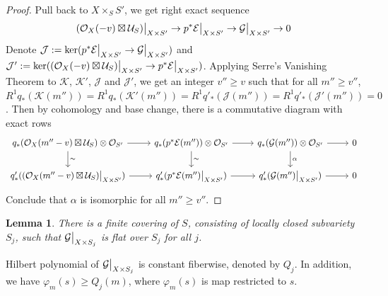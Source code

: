 \documentclass{ctexart}
\newtheorem{lemma}{Lemma}[section]
\begin{document}
\begin{proof}
    Pull back to $X \times_{S} S'$, we get right exact sequence
    \begin{equation}
        (\mathcal{O}_{X}(-v) \boxtimes \mathcal{U}_{S})\big{|}_{X \times S'} \rightarrow p^{\ast}\mathcal{E}\big{|}_{X \times S'} \rightarrow \mathcal{G}\big{|}_{X \times S'} \rightarrow 0
    \end{equation}
    Denote $\mathcal{J} := \ker (p^{\ast}\mathcal{E}\big{|}_{X \times S'} \rightarrow \mathcal{G}\big{|}_{X \times S'})$ and $\mathcal{J}' := \ker ((\mathcal{O}_{X}(-v) \boxtimes \mathcal{U}_{S})\big{|}_{X \times S'} \rightarrow p^{\ast}\mathcal{E}\big{|}_{X \times S'})$.
    Applying Serre's Vanishing Theorem to $\mathcal{K}$, $\mathcal{K}'$, $\mathcal{J}$ and $\mathcal{J}'$,
    we get an integer $v'' \ge v$ such that for all $m'' \ge v''$,
    $R^{1}q_{\ast}(\mathcal{K}(m'')) = R^{1}q_{\ast}(\mathcal{K}'(m'')) = R^{1}q'_{\ast}(\mathcal{J}(m'')) = R^{1}q'_{\ast}(\mathcal{J}'(m'')) = 0$.
    Then by cohomology and base change, there is a commutative diagram with exact rows
    \begin{equation*}
        \begin{tikzcd}
            q_{\ast}(\mathcal{O}_{X}(m'' - v) \boxtimes \mathcal{U}_{S}) \otimes \mathcal{O}_{S'} \arrow[r] \arrow[d, "\sim"] &
            q_{\ast}(p^{\ast}\mathcal{E}(m'')) \otimes \mathcal{O}_{S'} \arrow[r] \arrow[d, "\sim"] &
            q_{\ast}(\mathcal{G}(m'')) \otimes \mathcal{O}_{S'} \arrow[r] \arrow[d, "\alpha"] &
            0 \\
            q'_{\ast}((\mathcal{O}_{X}(m'' - v) \boxtimes \mathcal{U}_{S})\big{|}_{X \times S'}) \arrow[r] &
            q'_{\ast}(p^{\ast}\mathcal{E}(m'')\big{|}_{X \times S'}) \arrow[r] &
            q'_{\ast}(\mathcal{G}(m'')\big{|}_{X \times S'}) \arrow[r] &
            0
        \end{tikzcd}
    \end{equation*}
    Conclude that $\alpha$ is isomorphic for all $m'' \ge v''$.
\end{proof}
\begin{lemma}
    There is a finite covering of $S$, consisting of locally closed subvariety $S_{j}$,
    such that $\mathcal{G}\big{|}_{X \times S_{j}}$ is flat over $S_{j}$ for all $j$.
    \label{Lemma 7.11}
\end{lemma}
Hilbert polynomial of $\mathcal{G}\big{|}_{X \times S_{j}}$ is constant fiberwise, denoted by $Q_{j}$.
In addition, we have $\varphi_{m}(s) \ge Q_{j}(m)$, where $\varphi_{m}(s)$ is map restricted to $s$.
\end{document}

